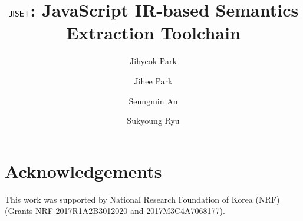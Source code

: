 \documentclass[sigconf]{acmart}
\begin{document}
\title{\( \text{\sf JISET} \): JavaScript IR-based Semantics Extraction Toolchain}

\author{Jihyeok Park}

\author{Jihee Park}

\author{Seungmin An}

\author{Sukyoung Ryu}


\maketitle









\section*{Acknowledgements}
This work was supported by National Research Foundation of
Korea (NRF) (Grants NRF-2017R1A2B3012020 and 2017M3C4A7068177).

\normalem


\end{document}
